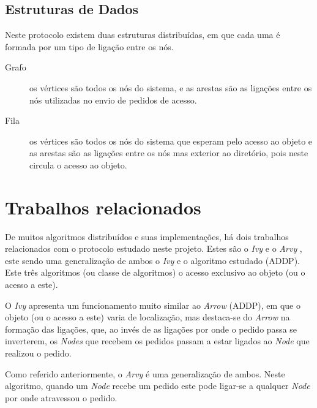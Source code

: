 \subsection*{Estruturas de Dados}
Neste protocolo existem duas estruturas distribuídas, em que cada uma é formada por um tipo de ligação entre os nós.

\begin{description} 
    \item [Grafo] os vértices são todos os nós do sistema, e as arestas são as ligações entre os nós utilizadas no envio de pedidos de acesso.
    \item [Fila] os vértices são todos os nós do sistema que esperam pelo acesso ao objeto  e as arestas são as ligações entre os nós mas exterior ao diretório, pois neste circula o acesso ao objeto.
\end{description}

\section{Trabalhos relacionados}
\label{motivacao:sec:trabalhos_relacionados}

De muitos algoritmos distribuídos e suas implementações, há dois trabalhos relacionados com o protocolo estudado neste projeto. Estes são o \emph{Ivy} \cite{Ivy} e o \emph{Arvy} \cite{Arvy}, este sendo uma generalização de ambos o \emph{Ivy} e o algoritmo estudado (\acs{ADDP}). Este três algoritmos (ou classe de algoritmos) o acesso exclusivo ao objeto (ou o acesso a este).


O \emph{Ivy} apresenta um funcionamento muito similar ao \emph{Arrow} (\acs*{ADDP}), em que o objeto (ou o acesso a este) varia de localização, mas destaca-se do \emph{Arrow} na formação das ligações, que, ao invés de as ligações por onde o pedido passa se inverterem, os \emph{Nodes} que recebem os pedidos passam a estar ligados ao \emph{Node} que realizou o pedido.

Como referido anteriormente, o \emph{Arvy} é uma generalização de ambos. Neste algoritmo, quando um \emph{Node} recebe um pedido este pode ligar-se a qualquer \emph{Node} por onde atravessou o pedido.




